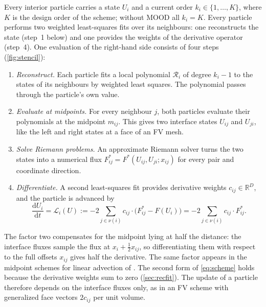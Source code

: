 \documentclass[smallextended]{svjour3}
\numberwithin{equation}{section}
\newcommand{\R}{\mathbb{R}}
\newcommand{\dd}{\mathrm{d}}
\newcommand{\nb}{\nu}
\newcommand{\Lop}{\mathcal{L}}
\newcommand{\Fs}{F^{*}}
\begin{document}
Every interior particle carries a state $U_i$ and a current order $k_i\in\{1,\dots,K\}$, where $K$ is the design order of the scheme; without MOOD all $k_i=K$. Every particle performs two weighted least-squares fits over its neighbours: one reconstructs the state (step~1 below) and one provides the weights of the derivative operator (step~4). One evaluation of the right-hand side consists of four steps (\cref{fig:stencil}):
\begin{enumerate}
\item \emph{Reconstruct.} Each particle fits a local polynomial $\mathcal{R}_i$ of degree $k_i-1$ to the states of its neighbours by weighted least squares. The polynomial passes through the particle's own value.
\item \emph{Evaluate at midpoints.} For every neighbour $j$, both particles evaluate their polynomials at the midpoint $m_{ij}$. This gives two interface states $U_{ij}$ and $U_{ji}$, like the left and right states at a face of an FV mesh.
\item \emph{Solve Riemann problems.} An approximate Riemann solver turns the two states into a numerical flux $\Fs_{ij}=\Fs(U_{ij},U_{ji};x_{ij})$ for every pair and coordinate direction.
\item \emph{Differentiate.} A second least-squares fit provides derivative weights $c_{ij}\in\R^D$, and the particle is advanced by
\begin{equation}\label{eq:scheme}
\frac{\dd U_i}{\dd t} = \Lop_i(U) := -2\sum_{j\in\nb(i)} c_{ij}\cdot\big(\Fs_{ij}-F(U_i)\big)
= -2\sum_{j\in\nb(i)} c_{ij}\cdot\Fs_{ij}.
\end{equation}
\end{enumerate}
The factor two compensates for the midpoint lying at half the distance: the interface fluxes sample the flux at $x_i+\tfrac12x_{ij}$, so differentiating them with respect to the full offsets $x_{ij}$ gives half the derivative. The same factor appears in the midpoint schemes for linear advection of \cite{Willems2025}. The second form of \eqref{eq:scheme} holds because the derivative weights sum to zero (\cref{sec:recfit}). The update of a particle therefore depends on the interface fluxes only, as in an FV scheme with generalized face vectors $2c_{ij}$ per unit volume.
\end{document}
